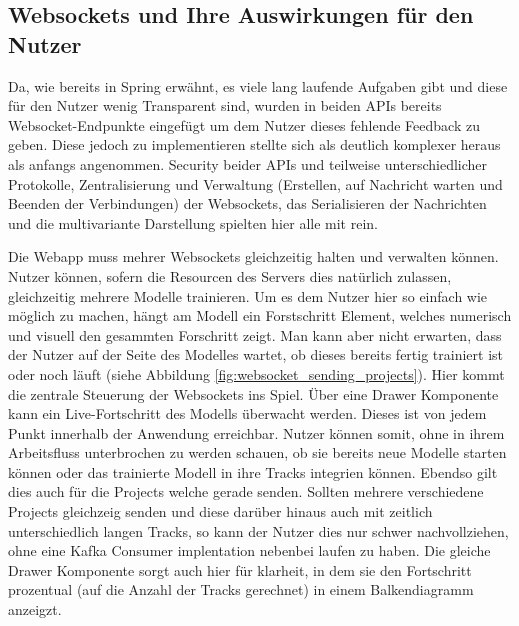 \subsection{Websockets und Ihre Auswirkungen für den Nutzer}
Da, wie bereits in Spring erwähnt, es viele lang laufende Aufgaben gibt und diese für den Nutzer wenig Transparent sind, wurden in beiden APIs bereits Websocket-Endpunkte eingefügt um dem Nutzer dieses fehlende Feedback zu geben.
Diese jedoch zu implementieren stellte sich als deutlich komplexer heraus als anfangs angenommen. Security beider APIs und teilweise unterschiedlicher Protokolle, 
Zentralisierung und Verwaltung (Erstellen, auf Nachricht warten und Beenden der Verbindungen) der Websockets, das Serialisieren der Nachrichten und die multivariante Darstellung spielten hier alle mit rein.


Die Webapp muss mehrer Websockets gleichzeitig halten und verwalten können.
Nutzer können, sofern die Resourcen des Servers dies natürlich zulassen, gleichzeitig mehrere Modelle trainieren. Um es dem Nutzer hier so einfach wie möglich zu machen, hängt am Modell ein Forstschritt Element, welches numerisch und visuell den gesammten Forschritt zeigt.
Man kann aber nicht erwarten, dass der Nutzer auf der Seite des Modelles wartet, ob dieses bereits fertig trainiert ist oder noch läuft (siehe Abbildung \ref{fig:websocket_sending_projects}).
Hier kommt die zentrale Steuerung der Websockets ins Spiel. Über eine Drawer Komponente kann ein Live-Fortschritt des Modells überwacht werden. Dieses ist von jedem Punkt innerhalb der Anwendung erreichbar.
Nutzer können somit, ohne in ihrem Arbeitsfluss unterbrochen zu werden schauen, ob sie bereits neue Modelle starten können oder das trainierte Modell in ihre Tracks integrien können.
Ebendso gilt dies auch für die Projects welche gerade senden. Sollten mehrere verschiedene Projects gleichzeig senden und diese darüber hinaus auch mit zeitlich unterschiedlich langen Tracks, so kann der Nutzer dies nur schwer nachvollziehen, ohne eine Kafka Consumer implentation nebenbei laufen zu haben.
Die gleiche Drawer Komponente sorgt auch hier für klarheit, in dem sie den Fortschritt prozentual (auf die Anzahl der Tracks gerechnet) in einem Balkendiagramm anzeigzt.

